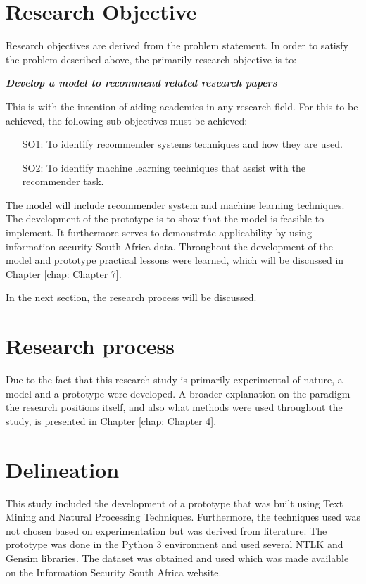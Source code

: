 \section{Research Objective} \label{ssec: Chapter 1}
Research objectives are derived from the problem statement. In order to satisfy the problem described above, the primarily research objective is to:

\textbf{\textit{Develop a model to recommend related research papers}}

This is with the intention of aiding academics in any research field. For this to be achieved, the following sub objectives must be achieved: 
\begin{itemize}
  \item[SO1:] To identify recommender systems techniques and how they are used.
  \item[SO2:] To identify machine learning techniques that assist with the recommender task.
\end{itemize}

The model will include recommender system and machine learning techniques. The development of the prototype is to show that the model is feasible to implement. It furthermore serves to demonstrate applicability by using information security South Africa data. Throughout the development of the model and prototype practical lessons were learned, which will be discussed in Chapter \ref{chap: Chapter 7}. 

In the next section, the research process will be discussed.

\section{Research process}
Due to the fact that this research study is primarily experimental of nature, a model and a prototype were developed. A broader explanation on the paradigm the research positions itself, and also what methods were used throughout the study, is presented in Chapter \ref{chap: Chapter 4}.

\section{Delineation}
This study included the development of a prototype that was built using Text Mining and Natural Processing Techniques. Furthermore, the techniques used was not chosen based on experimentation but was derived from literature. 
The prototype was done in the Python 3 environment and used several NTLK and Gensim libraries. The dataset was obtained and used which was made available on the Information Security South Africa website.

